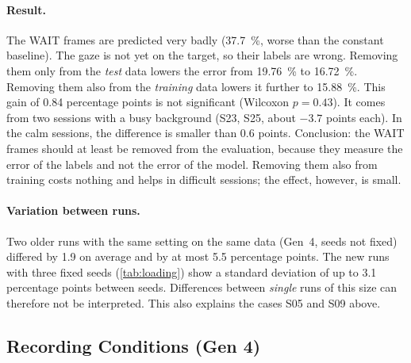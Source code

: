 \paragraph{Result.} The WAIT frames are predicted very badly
(\SI{37.7}{\percent}, worse than the constant baseline). The gaze is not yet on
the target, so their labels are wrong. Removing them only from the \emph{test}
data lowers the error from \SI{19.76}{\percent} to \SI{16.72}{\percent}.
Removing them also from the \emph{training} data lowers it further to
\SI{15.88}{\percent}. This gain of \num{0.84} percentage points is not
significant (Wilcoxon $p=0.43$). It comes from two sessions with a busy
background (S23, S25, about $-3.7$ points each). In the calm sessions, the
difference is smaller than \num{0.6} points. Conclusion: the WAIT frames should
at least be removed from the evaluation, because they measure the error of the
labels and not the error of the model. Removing them also from training costs
nothing and helps in difficult sessions; the effect, however, is small.

\paragraph{Variation between runs.} Two older runs with the same
setting on the same data (Gen~4, seeds not fixed) differed by \num{1.9} on
average and by at most \num{5.5} percentage points. The new runs with three
fixed seeds (\cref{tab:loading}) show a standard deviation of up to \num{3.1}
percentage points between seeds. Differences between \emph{single} runs of this
size can therefore not be interpreted. This also explains the cases S05 and S09
above.

\subsection{Recording Conditions (Gen 4)}
\label{sec:conditions}

